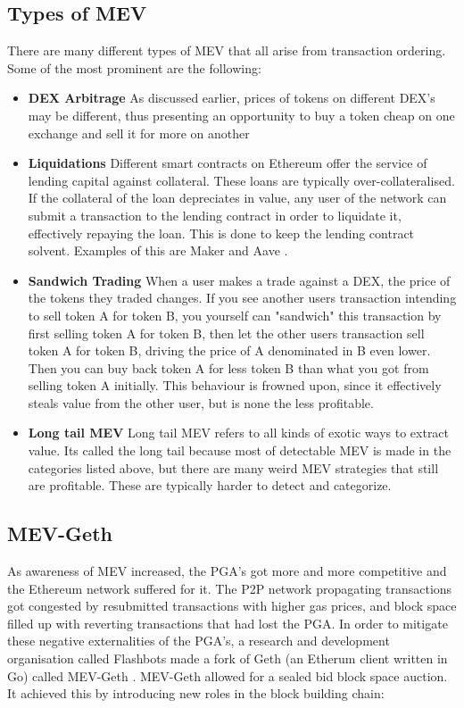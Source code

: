 \subsection{Types of MEV}
There are many different types of MEV that all arise from transaction ordering. Some of the most prominent are the following:
\begin{itemize}
    \item \textbf{DEX Arbitrage} As discussed earlier, prices of tokens on different DEX's may be different, thus presenting an opportunity to buy a token cheap on one exchange and sell it for more on another
    \item \textbf{Liquidations} Different smart contracts on Ethereum offer the service of lending capital against collateral. These loans are typically over-collateralised. If the collateral of the loan depreciates in value, any user of the network can submit a transaction to the lending contract in order to liquidate it, effectively repaying the loan. This is done to keep the lending contract solvent. Examples of this are Maker \cite{makerdao} and Aave \cite{Aave}.
    \item \textbf{Sandwich Trading} When a user makes a trade against a DEX, the price of the tokens they traded changes. If you see another users transaction intending to sell token A for token B, you yourself can "sandwich" this transaction by first selling token A for token B, then let the other users transaction sell token A for token B, driving the price of A denominated in B even lower. Then you can buy back token A for less token B than what you got from selling token A initially. This behaviour is frowned upon, since it effectively steals value from the other user, but is none the less profitable.
    \item \textbf{Long tail MEV} Long tail MEV refers to all kinds of exotic ways to extract value. Its called the long tail because most of detectable MEV is made in the categories listed above, but there are many weird MEV strategies that still are profitable. These are typically harder to detect and categorize. 
\end{itemize}

\subsection{MEV-Geth}

As awareness of MEV increased, the PGA's got more and more competitive and the Ethereum network suffered for it. The P2P network propagating transactions got congested by resubmitted transactions with higher gas prices, and block space filled up with reverting transactions that had lost the PGA. In order to mitigate these negative externalities of the PGA's, a research and development organisation called Flashbots made a fork of Geth (an Etherum client written in Go) called MEV-Geth \cite{frontrunMEV}. MEV-Geth allowed for a sealed bid block space auction. It achieved this by introducing new roles in the block building chain:

